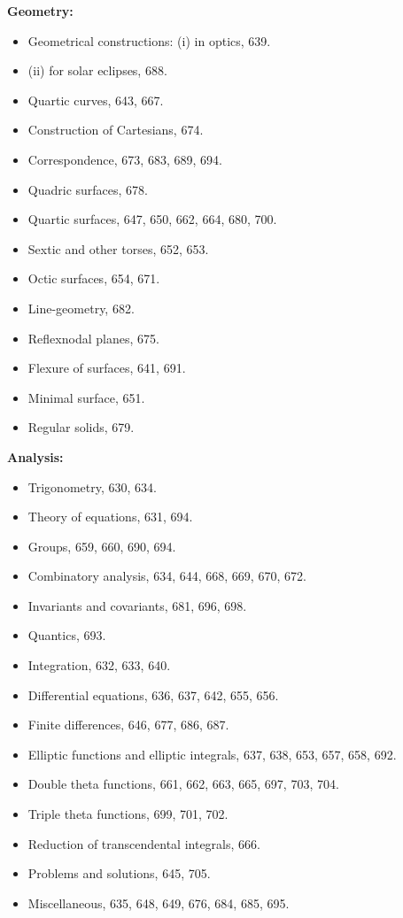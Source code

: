 \documentclass[12pt,a4paper]{article}
\theoremstyle{plain}
\theoremstyle{definition}
\theoremstyle{remark}
\begin{document}
\textbf{Geometry:}

\begin{itemize}[leftmargin=2em,label=\textbullet]
\item Geometrical constructions: (i) in optics, 639.
\item[] \phantom{Geometrical constructions:} (ii) for solar eclipses, 688.
\item Quartic curves, 643, 667.
\item Construction of Cartesians, 674.
\item Correspondence, 673, 683, 689, 694.
\item Quadric surfaces, 678.
\item Quartic surfaces, 647, 650, 662, 664, 680, 700.
\item Sextic and other torses, 652, 653.
\item Octic surfaces, 654, 671.
\item Line-geometry, 682.
\item Reflexnodal planes, 675.
\item Flexure of surfaces, 641, 691.
\item Minimal surface, 651.
\item Regular solids, 679.
\end{itemize}

\textbf{Analysis:}

\begin{itemize}[leftmargin=2em,label=\textbullet]
\item Trigonometry, 630, 634.
\item Theory of equations, 631, 694.
\item Groups, 659, 660, 690, 694.
\item Combinatory analysis, 634, 644, 668, 669, 670, 672.
\item Invariants and covariants, 681, 696, 698.
\item Quantics, 693.
\item Integration, 632, 633, 640.
\item Differential equations, 636, 637, 642, 655, 656.
\item Finite differences, 646, 677, 686, 687.
\item Elliptic functions and elliptic integrals, 637, 638, 653, 657, 658, 692.
\item Double theta functions, 661, 662, 663, 665, 697, 703, 704.
\item Triple theta functions, 699, 701, 702.
\item Reduction of transcendental integrals, 666.
\item Problems and solutions, 645, 705.
\item Miscellaneous, 635, 648, 649, 676, 684, 685, 695.
\end{itemize}
\clearpage
\end{document}
